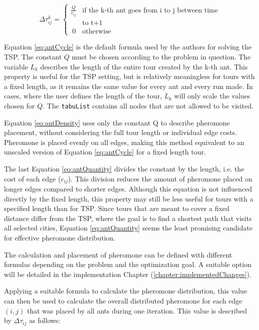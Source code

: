 \begin{equation}\label{eq:antQuantity}
	\Delta\tau_{ij}^k = \begin{cases}
	\frac{Q}{c_{ij}} &\text{if the k-th ant goes from i to j between time} \\
		&\text{to t+1} \\\
	0 &\text{otherwise}
\end{cases}	
\end{equation}

Equation \ref{eq:antCycle} is the default formula used by the authors for solving the TSP.
The constant $Q$ must be chosen according to the problem in question.
The variable $L_k$ describes the length of the entire tour created by the k-th ant.
This property is useful for the TSP setting, but is relatively meaningless for tours with a fixed length, as it remains the same value for every ant and every run made.
In cases, where the user defines the length of the tour, $L_k$ will only scale the values chosen for $Q$.
The \texttt{tabuList} contains all nodes that are not allowed to be visited.

Equation \ref{eq:antDensity} uses only the constant Q to describe pheromone placement, without considering the full tour length or individual edge costs. 
Pheromone is placed evenly on all edges, making this method equivalent to an unscaled version of Equation \ref{eq:antCycle} for a fixed length tour.

The last Equation \ref{eq:antQuantity} divides the constant by the length, i.e. the cost of each edge ($c_{ij}$). 
This division reduces the amount of pheromone placed on longer edges compared to shorter edges. 
Although this equation is not influenced directly by the fixed length, this property may still be less useful for tours with a specified length than for TSP.
Since tours that are meant to cover a fixed distance differ from the TSP, where the goal is to find a shortest path that visits all selected cities, Equation \ref{eq:antQuantity} seems the least promising candidate for effective pheromone distribution.

The calculation and placement of pheromone can be defined with different formulas depending on the problem and the optimization goal. 
A suitable option will be detailed in the implementation Chapter (\ref{chapter:implementedChanges}).


Applying a suitable formula to calculate the pheromone distribution, this value can then be used to calculate the overall distributed pheromone for each edge $(i,j)$ that was placed by all ants during one iteration.
This value is described by $\Delta\tau_{ij}$ as follows:

